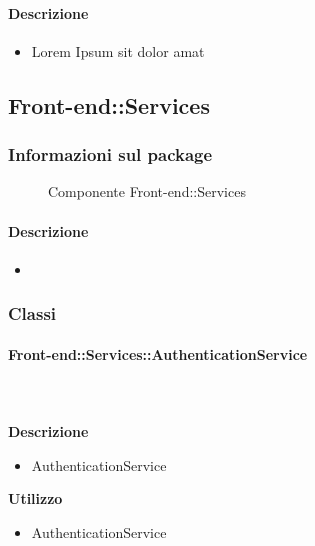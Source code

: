   \paragraph{Descrizione} 
    \begin{itemize}
    \item[] Lorem Ipsum sit dolor amat
    \end{itemize} 
  \subsection{Front-end::Services}
  \subsubsection{Informazioni sul package} 

    \begin{figure}[H] 
      \begin{center} 
        \caption{Componente Front-end::Services}
      \end{center}  
    \end{figure} 

  \paragraph{Descrizione} 
    \begin{itemize}
    \item[] 
    \end{itemize} 
    \subsubsection{Classi}
      \paragraph{Front-end::Services::AuthenticationService}
        
        \textbf{\\ \\ Descrizione} 
          \begin{itemize}
            \item[] AuthenticationService
          \end{itemize}      
        \textbf{Utilizzo}  
          \begin{itemize}
            \item[] AuthenticationService
          \end{itemize}
